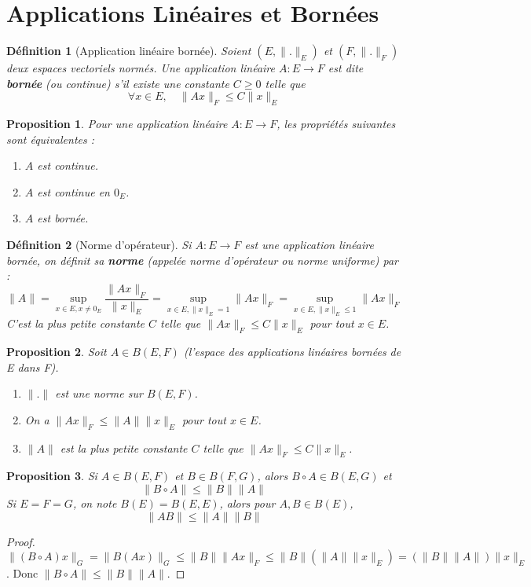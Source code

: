 \documentclass{article}
\newtheorem{proposition}{Proposition} %
\newtheorem{definition}{Définition} %
\theoremstyle{definition} %
\begin{document}
\section{Applications Linéaires et Bornées}

\begin{definition}[Application linéaire bornée]
Soient $(E, \|.\|_E)$ et $(F, \|.\|_F)$ deux espaces vectoriels normés. Une application linéaire $A: E \to F$ est dite \textbf{bornée} (ou continue) s'il existe une constante $C \ge 0$ telle que
\[ \forall x \in E, \quad \|Ax\|_F \le C \|x\|_E \]
\end{definition}

\begin{proposition}
Pour une application linéaire $A: E \to F$, les propriétés suivantes sont équivalentes :
\begin{enumerate}
    \item $A$ est continue.
    \item $A$ est continue en $0_E$.
    \item $A$ est bornée.
\end{enumerate}
\end{proposition}

\begin{definition}[Norme d'opérateur]
Si $A: E \to F$ est une application linéaire bornée, on définit sa \textbf{norme} (appelée norme d'opérateur ou norme uniforme) par :
\[ \|A\| = \sup_{x \in E, x \ne 0_E} \frac{\|Ax\|_F}{\|x\|_E} = \sup_{x \in E, \|x\|_E = 1} \|Ax\|_F = \sup_{x \in E, \|x\|_E \le 1} \|Ax\|_F \]
C'est la plus petite constante $C$ telle que $\|Ax\|_F \le C \|x\|_E$ pour tout $x \in E$.
\end{definition}

\begin{proposition}
Soit $A \in B(E, F)$ (l'espace des applications linéaires bornées de E dans F).
\begin{enumerate}
    \item $\|.\|$ est une norme sur $B(E, F)$.
    \item On a $\|Ax\|_F \le \|A\| \|x\|_E$ pour tout $x \in E$.
    \item $\|A\|$ est la plus petite constante $C$ telle que $\|Ax\|_F \le C \|x\|_E$.
\end{enumerate}
\end{proposition}

\begin{proposition}
Si $A \in B(E, F)$ et $B \in B(F, G)$, alors $B \circ A \in B(E, G)$ et
\[ \|B \circ A\| \le \|B\| \|A\| \]
Si $E=F=G$, on note $B(E) = B(E,E)$, alors pour $A, B \in B(E)$,
\[ \|AB\| \le \|A\| \|B\| \]
\end{proposition}
\begin{proof}
$\| (B \circ A) x \|_G = \| B(Ax) \|_G \le \|B\| \|Ax\|_F \le \|B\| (\|A\| \|x\|_E) = (\|B\| \|A\|) \|x\|_E$.
Donc $\|B \circ A\| \le \|B\| \|A\|$.
\end{proof}
\end{document}
